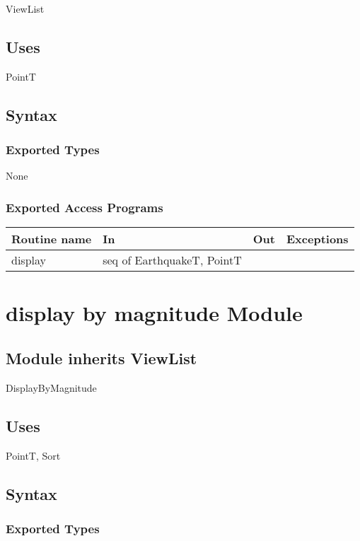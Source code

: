 \documentclass[12pt]{article}
\begin{document}
ViewList

\subsection* {Uses}

PointT

\subsection* {Syntax}

\subsubsection* {Exported Types}

None

\subsubsection* {Exported Access Programs}

\begin{tabular}{| l | l | l | l |}
\hline
\textbf{Routine name} & \textbf{In} & \textbf{Out} & \textbf{Exceptions}\\
\hline
display & seq of EarthquakeT, PointT & ~ &  ~\\
\hline
\end{tabular}




\newpage

\section* {display by magnitude Module}

\subsection* {Module inherits ViewList}

DisplayByMagnitude

\subsection* {Uses}

PointT, Sort

\subsection* {Syntax}

\subsubsection* {Exported Types}
\end{document}
